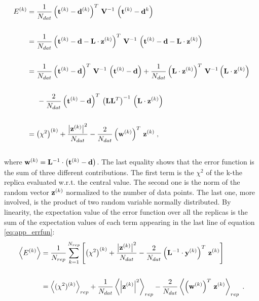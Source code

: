 \documentclass[../main.tex]{subfiles}
\begin{document}
\\
\begin{equation}
\begin{split}
    E^{(k)} & = \frac{1}{N_{dat}} \left(\mathbf{t}^{(k)} - \mathbf{d}^{(k)}\right)^T \, \mathbf{V}^{-1} \, \left( \mathbf{t}^{(k)} - \mathbf{d}^{k} \right) \\\\
    & = \frac{1}{N_{dat}} \left(\mathbf{t}^{(k)} - \mathbf{d} - \mathbf{L} \cdot \mathbf{z}^{(k)} \right)^T \, \mathbf{V}^{-1} \, \left(\mathbf{t}^{(k)} - \mathbf{d} - \mathbf{L} \cdot \mathbf{z}^{(k)} \right) \\\\
    & = \frac{1}{N_{dat}} \left( \mathbf{t}^{(k)} - \mathbf{d}\right)^T \, \mathbf{V}^{-1} \, \left( \mathbf{t}^{(k)} - \mathbf{d}\right) + \frac{1}{N_{dat}} \left( \mathbf{L} \cdot \mathbf{z}^{(k)} \right)^T \, \mathbf{V}^{-1} \left(  \mathbf{L} \cdot \mathbf{z}^{(k)} \right)\\\\
    & \hspace{5mm} - \frac{2}{N_{dat}} \left( \mathbf{t}^{(k)} - \mathbf{d}\right)^T \, \left(\mathbf{L}\mathbf{L}^{T} \right)^{-1} \, \left(\mathbf{L} \cdot \mathbf{z}^{(k)}\right)\\\\
    & = \left(\chi^2\right)^{(k)} + \frac{\left| \mathbf{z}^{(k)} \right|^2}{N_{dat}} - \frac{2}{N_{dat}} \left(\mathbf{w}^{(k)}\right)^T  \, \mathbf{z}^{(k)} \;,
\end{split}
\label{eq:app_errfun}
\end{equation}
\\
where $\mathbf{w}^{(k)} = \mathbf{L}^{-1} \cdot \left( \mathbf{t}^{(k)} - \mathbf{d} \right)$. The last equality shows that the error function is the sum of three different contributions. The first term is the $\chi^2$ of the k-the replica evaluated w.r.t. the central value. The second one is the norm of the random vector $\mathbf{z}^{(k)}$ normalized to the number of data points. The last one, more involved, is the product of two random variable normally distributed. By linearity, the expectation value of the error function over all the replicas is the sum of the expectation values of each term appearing in the last line of equation \eqref{eq:app_errfun}:
\\
\begin{equation}
\begin{split}
    \left< E^{(k)} \right> & = \frac{1}{N_{rep}} \sum_{k=1}^{N_{rep}} \left[ \left(\chi^2\right)^{(k)} + \frac{\left| \mathbf{z}^{(k)} \right|^2}{N_{dat}} - \frac{2}{N_{dat}} \left( \mathbf{L}^{-1} \cdot \mathbf{y}^{(k)}\right)^T  \, \mathbf{z}^{(k)}\right] \\\\
    & = \left<(\chi^2)^{(k)}\right>_{rep} + \frac{1}{N_{dat}} \left< \left| \mathbf{z}^{(k)} \right|^2 \right>_{rep} - \frac{2}{N_{dat}} \left<\left(\mathbf{w}^{(k)}\right)^T  \, \mathbf{z}^{(k)}\right>_{rep} \;.
\end{split}
\end{equation}
\end{document}
